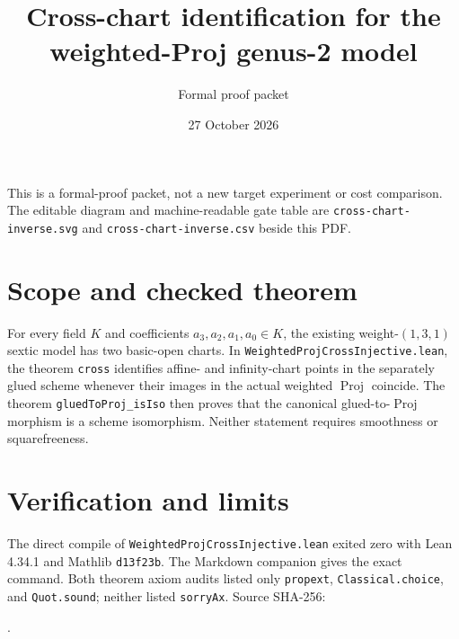 \documentclass[11pt]{article}
\title{Cross-chart identification for the weighted-Proj genus-2 model}
\author{Formal proof packet}
\date{27 October 2026}
\begin{document}
\maketitle
\noindent This is a formal-proof packet, not a new target experiment or cost comparison. The editable diagram and machine-readable gate table are \texttt{cross-chart-inverse.svg} and \texttt{cross-chart-inverse.csv} beside this PDF.

\section*{Scope and checked theorem}
For every field $K$ and coefficients $a_3,a_2,a_1,a_0\in K$, the existing weight-$(1,3,1)$ sextic model has two basic-open charts. In \texttt{WeightedProjCrossInjective.lean}, the theorem \texttt{cross} identifies affine- and infinity-chart points in the separately glued scheme whenever their images in the actual weighted $\operatorname{Proj}$ coincide. The theorem \texttt{gluedToProj\_isIso} then proves that the canonical glued-to-$\operatorname{Proj}$ morphism is a scheme isomorphism. Neither statement requires smoothness or squarefreeness.

\begin{center}
\setlength{\fboxsep}{8pt}
\end{center}

\section*{Verification and limits}
The direct compile of \texttt{WeightedProjCrossInjective.lean} exited zero with Lean 4.34.1 and Mathlib \texttt{d13f23b}. The Markdown companion gives the exact command. Both theorem axiom audits listed only \texttt{propext}, \texttt{Classical.choice}, and \texttt{Quot.sound}; neither listed \texttt{sorryAx}. Source SHA-256:\par\smallskip{}.
\end{document}

